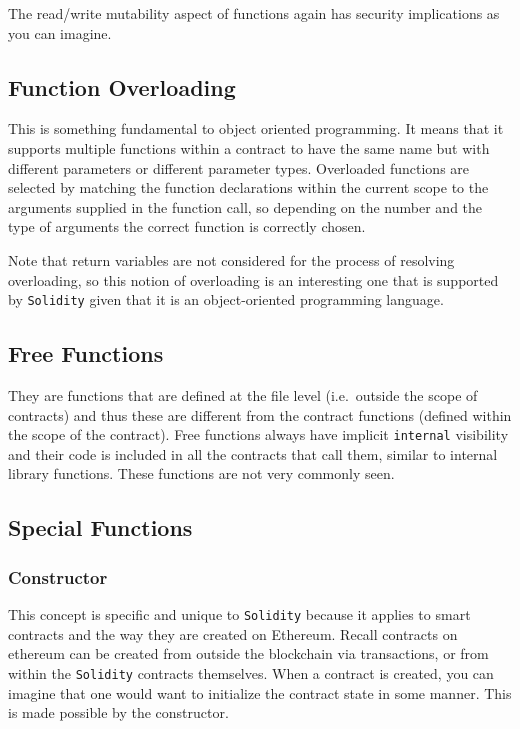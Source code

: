 The read/write mutability aspect of functions again has security
implications as you can imagine.

\subsection{Function Overloading}\label{function-overloading}

This is something fundamental to object oriented programming. It means
that it supports multiple functions within a contract to have the same
name but with different parameters or different parameter types.
Overloaded functions are selected by matching the function declarations
within the current scope to the arguments supplied in the function call,
so depending on the number and the type of arguments the correct
function is correctly chosen.

Note that return variables are not considered for the process of
resolving overloading, so this notion of overloading is an interesting
one that is supported by \texttt{Solidity} given that it is an
object-oriented programming language.

\subsection{Free Functions}\label{free-functions}

They are functions that are defined at the file level (i.e.~outside the
scope of contracts) and thus these are different from the contract
functions (defined within the scope of the contract). Free functions
always have implicit \texttt{internal} visibility and their code is
included in all the contracts that call them, similar to internal
library functions. These functions are not very commonly seen.

\subsection{Special Functions}\label{special-functions}

\subsubsection{Constructor}\label{constructor}

This concept is specific and unique to \texttt{Solidity} because it
applies to smart contracts and the way they are created on Ethereum.
Recall contracts on ethereum can be created from outside the blockchain
via transactions, or from within the \texttt{Solidity} contracts
themselves. When a contract is created, you can imagine that one would
want to initialize the contract state in some manner. This is made
possible by the constructor.

